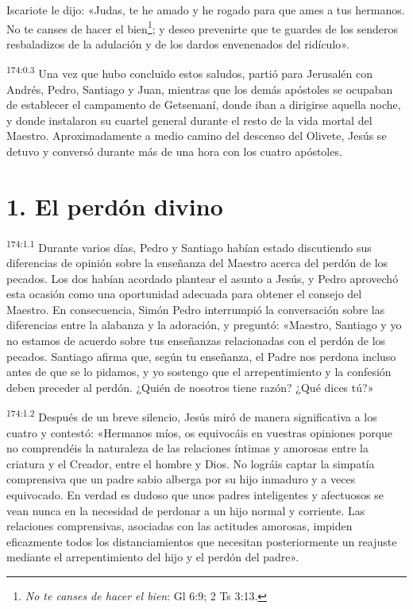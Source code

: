 Iscariote le dijo: «Judas, te he amado y he rogado para que ames a tus hermanos. No te canses de hacer el bien\footnote{\textit{No te canses de hacer el bien}: Gl 6:9; 2 Ts 3:13.}; y deseo prevenirte que te guardes de los senderos resbaladizos de la adulación y de los dardos envenenados del ridículo».

\par
\textsuperscript{174:0.3} Una vez que hubo concluido estos saludos, partió para Jerusalén con Andrés, Pedro, Santiago y Juan, mientras que los demás apóstoles se ocupaban de establecer el campamento de Getsemaní, donde iban a dirigirse aquella noche, y donde instalaron su cuartel general durante el resto de la vida mortal del Maestro. Aproximadamente a medio camino del descenso del Olivete, Jesús se detuvo y conversó durante más de una hora con los cuatro apóstoles.

\section*{1. El perdón divino}
\par
\textsuperscript{174:1.1} Durante varios días, Pedro y Santiago habían estado discutiendo sus diferencias de opinión sobre la enseñanza del Maestro acerca del perdón de los pecados. Los dos habían acordado plantear el asunto a Jesús, y Pedro aprovechó esta ocasión como una oportunidad adecuada para obtener el consejo del Maestro. En consecuencia, Simón Pedro interrumpió la conversación sobre las diferencias entre la alabanza y la adoración, y preguntó: «Maestro, Santiago y yo no estamos de acuerdo sobre tus enseñanzas relacionadas con el perdón de los pecados. Santiago afirma que, según tu enseñanza, el Padre nos perdona incluso antes de que se lo pidamos, y yo sostengo que el arrepentimiento y la confesión deben preceder al perdón. ¿Quién de nosotros tiene razón? ¿Qué dices tú?»

\par
\textsuperscript{174:1.2} Después de un breve silencio, Jesús miró de manera significativa a los cuatro y contestó: «Hermanos míos, os equivocáis en vuestras opiniones porque no comprendéis la naturaleza de las relaciones íntimas y amorosas entre la criatura y el Creador, entre el hombre y Dios. No lográis captar la simpatía comprensiva que un padre sabio alberga por su hijo inmaduro y a veces equivocado. En verdad es dudoso que unos padres inteligentes y afectuosos se vean nunca en la necesidad de perdonar a un hijo normal y corriente. Las relaciones comprensivas, asociadas con las actitudes amorosas, impiden eficazmente todos los distanciamientos que necesitan posteriormente un reajuste mediante el arrepentimiento del hijo y el perdón del padre».

